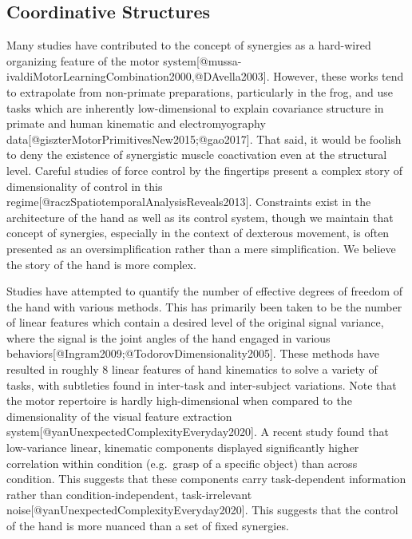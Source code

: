 \subsection{Coordinative Structures}\label{coordinative-structures}

Many studies have contributed to the concept of synergies as a
hard-wired organizing feature of the motor
system{[}@mussa-ivaldiMotorLearningCombination2000,@DAvella2003{]}.
However, these works tend to extrapolate from non-primate preparations,
particularly in the frog, and use tasks which are inherently
low-dimensional to explain covariance structure in primate and human
kinematic and electromyography
data{[}@giszterMotorPrimitivesNew2015;@gao2017{]}. That said, it would
be foolish to deny the existence of synergistic muscle coactivation even
at the structural level. Careful studies of force control by the
fingertips present a complex story of dimensionality of control in this
regime{[}@raczSpatiotemporalAnalysisReveals2013{]}. Constraints exist in
the architecture of the hand as well as its control system, though we
maintain that concept of synergies, especially in the context of
dexterous movement, is often presented as an oversimplification rather
than a mere simplification. We believe the story of the hand is more
complex.

Studies have attempted to quantify the number of effective degrees of
freedom of the hand with various methods. This has primarily been taken
to be the number of linear features which contain a desired level of the
original signal variance, where the signal is the joint angles of the
hand engaged in various
behaviors{[}@Ingram2009;@TodorovDimensionality2005{]}. These methods
have resulted in roughly 8 linear features of hand kinematics to solve a
variety of tasks, with subtleties found in inter-task and inter-subject
variations. Note that the motor repertoire is hardly high-dimensional
when compared to the dimensionality of the visual feature extraction
system{[}@yanUnexpectedComplexityEveryday2020{]}. A recent study found
that low-variance linear, kinematic components displayed significantly
higher correlation within condition (e.g.~grasp of a specific object)
than across condition. This suggests that these components carry
task-dependent information rather than condition-independent,
task-irrelevant noise{[}@yanUnexpectedComplexityEveryday2020{]}. This
suggests that the control of the hand is more nuanced than a set of
fixed synergies.

